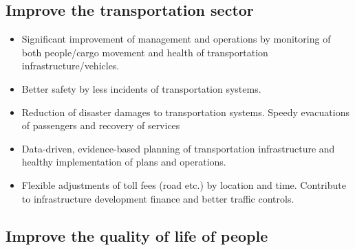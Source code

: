 \subsection{Improve the transportation sector}

\begin{itemize}

\item Significant improvement of management and operations by monitoring of both people/cargo movement and health of transportation infrastructure/vehicles.

\item Better safety by less incidents of transportation systems.

\item Reduction of disaster damages to transportation systems. Speedy evacuations of passengers and recovery of services

\item Data-driven, evidence-based planning of transportation infrastructure and healthy implementation of plans and operations.

\item Flexible adjustments of toll fees (road etc.) by location and time. Contribute to infrastructure development finance and better traffic controls.

\end{itemize}


\subsection{Improve the quality of life of people}

